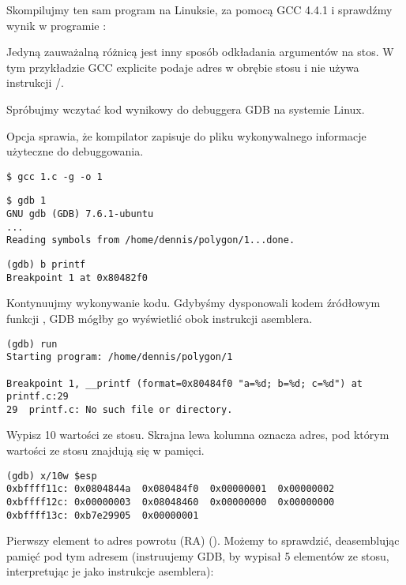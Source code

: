 
Skompilujmy ten sam program na Linuksie, za pomocą GCC 4.4.1 i sprawdźmy wynik w programie \IDA:



Jedyną zauważalną różnicą jest inny sposób odkładania argumentów na stos.
W tym przykładzie GCC explicite podaje adres w obrębie stosu i nie używa instrukcji \PUSH/\POP.


Spróbujmy wczytać kod wynikowy do debuggera \ac{GDB} na systemie Linux.

Opcja  sprawia, że kompilator zapisuje do pliku wykonywalnego informacje użyteczne do debuggowania.

\begin{lstlisting}
$ gcc 1.c -g -o 1
\end{lstlisting}

\begin{lstlisting}
$ gdb 1
GNU gdb (GDB) 7.6.1-ubuntu
...
Reading symbols from /home/dennis/polygon/1...done.
\end{lstlisting}

\begin{lstlisting}[caption=Ustawmy breakpoint w funkcji \printf]
(gdb) b printf
Breakpoint 1 at 0x80482f0
\end{lstlisting}

Kontynuujmy wykonywanie kodu.
Gdybyśmy dysponowali kodem źródłowym funkcji \printf, \ac{GDB} mógłby go wyświetlić obok instrukcji asemblera.

\begin{lstlisting}
(gdb) run
Starting program: /home/dennis/polygon/1

Breakpoint 1, __printf (format=0x80484f0 "a=%d; b=%d; c=%d") at printf.c:29
29	printf.c: No such file or directory.
\end{lstlisting}

Wypisz 10 wartości ze stosu. Skrajna lewa kolumna oznacza adres, pod którym wartości ze stosu znajdują się w pamięci.

\begin{lstlisting}
(gdb) x/10w $esp
0xbffff11c:	0x0804844a	0x080484f0	0x00000001	0x00000002
0xbffff12c:	0x00000003	0x08048460	0x00000000	0x00000000
0xbffff13c:	0xb7e29905	0x00000001
\end{lstlisting}

Pierwszy element to adres powrotu (\ac{RA}) ().
Możemy to sprawdzić, deasemblując pamięć pod tym adresem (instruujemy GDB, by wypisał 5 elementów ze stosu, interpretując je jako instrukcje asemblera):

